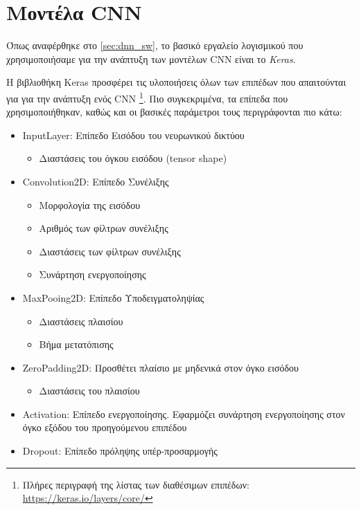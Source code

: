\section{Μοντέλα CNN}
\label{sec:cnn_impl}

Όπως αναφέρθηκε στο \autoref{sec:dnn_sw}, το βασικό εργαλείο λογισμικού που
χρησιμοποιήσαμε για την ανάπτυξη των μοντέλων CNN είναι το \emph{Keras}.

Η βιβλιοθήκη Keras προσφέρει τις υλοποιήσεις όλων των επιπέδων που
απαιτούνται για για την ανάπτυξη ενός CNN
\footnote{Πλήρες περιγραφή της λίστας των διαθέσιμων επιπέδων: \href{https://keras.io/layers/core/}{https://keras.io/layers/core/}}.
Πιο συγκεκριμένα, τα επίπεδα που χρησιμοποιήθηκαν, καθώς και οι βασικές
παράμετροι τους περιγράφονται πιο κάτω:
\begin{itemize} %
  \item{InputLayer: Επίπεδο Εισόδου του νευρωνικού δικτύου}
    \begin{itemize}
      \item{Διαστάσεις του όγκου εισόδου (tensor shape)}
    \end{itemize}
  \item{Convolution2D: Επίπεδο Συνέλιξης}
    \begin{itemize}
      \item{Μορφολογία της εισόδου}
      \item{Αριθμός των φίλτρων συνέλιξης}
      \item{Διαστάσεις των φίλτρων συνέλιξης}
      \item{Συνάρτηση ενεργοποίησης}
    \end{itemize}
  \item{MaxPooing2D: Επίπεδο Υποδειγματοληψίας}
    \begin{itemize}
      \item{Διαστάσεις πλαισίου}
      \item{Βήμα μετατόπισης}
    \end{itemize}
  \item{ZeroPadding2D: Προσθέτει πλαίσιο με μηδενικά στον όγκο εισόδου}
    \begin{itemize}
      \item{Διαστάσεις του πλαισίου}
    \end{itemize}
  \item{Activation: Επίπεδο ενεργοποίησης. Εφαρμόζει συνάρτηση ενεργοποίησης στον
    όγκο εξόδου του προηγούμενου επιπέδου}
  \item{Dropout: Επίπεδο πρόληψης υπέρ-προσαρμογής \cite{lecun2015deep}}

\end{itemize}
